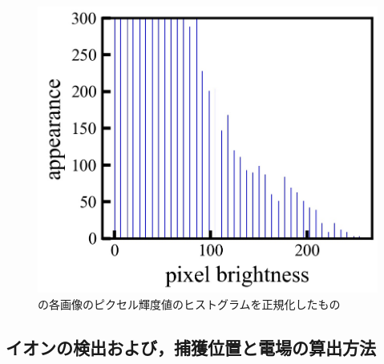 \begin{figure}[h]
\begin{center}
		\begin{minipage}{0.3\linewidth}
			\includegraphics[width=0.98\columnwidth]{./theory/figure/5/norm_hist_1.jpg}
		\end{minipage}
	\end{center}
	\caption{の各画像のピクセル輝度値のヒストグラムを正規化したもの}
	\label{fig:hist_norm}
\end{figure}



\subsection{イオンの検出および，捕獲位置と電場の算出方法}